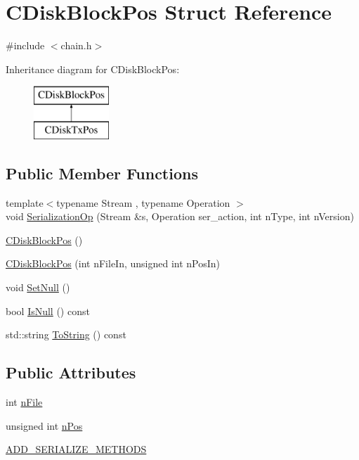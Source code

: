 \hypertarget{struct_c_disk_block_pos}{}\section{C\+Disk\+Block\+Pos Struct Reference}
\label{struct_c_disk_block_pos}


{\ttfamily \#include $<$chain.\+h$>$}

Inheritance diagram for C\+Disk\+Block\+Pos\+:\begin{figure}[H]
\begin{center}
\leavevmode
\includegraphics[height=2.000000cm]{struct_c_disk_block_pos}
\end{center}
\end{figure}
\subsection*{Public Member Functions}
\begin{DoxyCompactItemize}
\item 
{\footnotesize template$<$typename Stream , typename Operation $>$ }\\void \mbox{\hyperlink{struct_c_disk_block_pos_a821bb4eebc99ae39c20133d80244325f}{Serialization\+Op}} (Stream \&s, Operation ser\+\_\+action, int n\+Type, int n\+Version)
\item 
\mbox{\hyperlink{struct_c_disk_block_pos_ac34e46c8bf3256b3eca09f54911cf8bd}{C\+Disk\+Block\+Pos}} ()
\item 
\mbox{\hyperlink{struct_c_disk_block_pos_a0c96947d09bb4aaf28ab2d7866d20918}{C\+Disk\+Block\+Pos}} (int n\+File\+In, unsigned int n\+Pos\+In)
\item 
void \mbox{\hyperlink{struct_c_disk_block_pos_a0a6ba113219a456472081ee6d6b20a72}{Set\+Null}} ()
\item 
bool \mbox{\hyperlink{struct_c_disk_block_pos_a7dd98fe3f5372d358df61db31899b0af}{Is\+Null}} () const
\item 
std\+::string \mbox{\hyperlink{struct_c_disk_block_pos_aec119689268c0dc9c2f1e3b25fd859ad}{To\+String}} () const
\end{DoxyCompactItemize}
\subsection*{Public Attributes}
\begin{DoxyCompactItemize}
\item 
int \mbox{\hyperlink{struct_c_disk_block_pos_a09f30dab5c02fbdea8a17f9bcee5aac8}{n\+File}}
\item 
unsigned int \mbox{\hyperlink{struct_c_disk_block_pos_a9b4b5e149b655ac5c22d05883b5bca0e}{n\+Pos}}
\item 
\mbox{\hyperlink{struct_c_disk_block_pos_a958cd730b290bbb0153d514c56517590}{A\+D\+D\+\_\+\+S\+E\+R\+I\+A\+L\+I\+Z\+E\+\_\+\+M\+E\+T\+H\+O\+DS}}
\end{DoxyCompactItemize}
